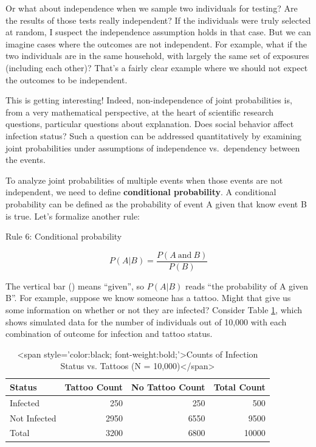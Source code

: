 \documentclass[
]{book}
\begin{document}
Or what about independence when we sample two individuals for testing? Are the results of those tests really independent? If the individuals were truly selected at random, I suspect the independence assumption holds in that case. But we can imagine cases where the outcomes are not independent. For example, what if the two individuals are in the same household, with largely the same set of exposures (including each other)? That's a fairly clear example where we should not expect the outcomes to be independent.

This is getting interesting! Indeed, non-independence of joint probabilities is, from a very mathematical perspective, at the heart of scientific research questions, particular questions about explanation. Does social behavior affect infection status? Such a question can be addressed quantitatively by examining joint probabilities under assumptions of independence vs.~dependency between the events.

To analyze joint probabilities of multiple events when those events are not independent, we need to define \textbf{conditional probability}. A conditional probability can be defined as the probability of event A given that know event B is true. Let's formalize another rule:

Rule 6: Conditional probability

\[
P(A|B) = \frac{P(A\ \text{and}\ B)}{P(B)}
\]

The vertical bar (\textbar) means ``given'', so \(P(A|B)\) reads ``the probability of A given B''. For example, suppose we know someone has a tattoo. Might that give us some information on whether or not they are infected? Consider Table \ref{tab:c7t1}, which shows simulated data for the number of individuals out of 10,000 with each combination of outcome for infection and tattoo status.

\begin{table}
\centering
\caption{\label{tab:c7t1}<span style='color:black; font-weight:bold;'>Counts of Infection Status vs. Tattoos (N = 10,000)</span>}
\centering
\begin{tabular}[t]{l|r|r|r}
\hline
Status & Tattoo Count & No Tattoo Count & Total Count\\
\hline
Infected & 250 & 250 & 500\\
\hline
Not Infected & 2950 & 6550 & 9500\\
\hline
Total & 3200 & 6800 & 10000\\
\hline
\end{tabular}
\end{table}
\end{document}
